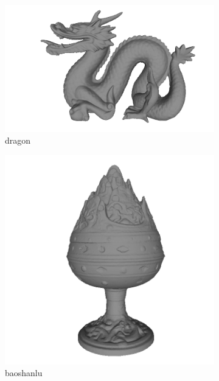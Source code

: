 \begin{figure}
	\begin{subfigure}[b]{0.23\linewidth}
		\includegraphics[width=\linewidth]{./Figures/test-dataset/02.dragon.png}
		\caption{dragon}
	\end{subfigure}
	\begin{subfigure}[b]{0.23\linewidth}
		\includegraphics[width=\linewidth]{./Figures/test-dataset/03.baoshanlu.png}
		\caption{baoshanlu}
	\end{subfigure}
	\begin{subfigure}[b]{0.23\linewidth}

\end{subfigure}
\end{figure}
